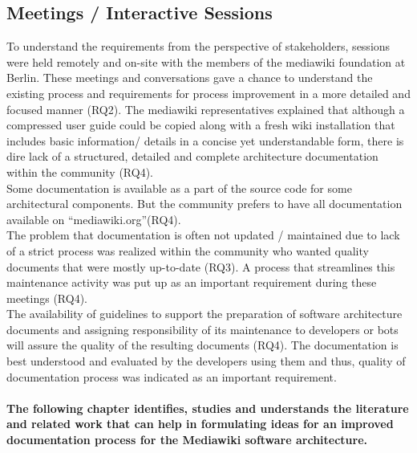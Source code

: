 \subsection{Meetings / Interactive Sessions}
\indent To understand the requirements from the perspective of stakeholders, sessions were held remotely and on-site with the members of the mediawiki foundation at Berlin. These meetings and conversations gave a chance to understand the existing process and requirements for process improvement in a more detailed and focused manner (RQ2).
The mediawiki representatives explained that although a compressed user guide could be copied along with a fresh wiki installation that includes basic information/ details in a concise yet understandable form, there is dire lack of a structured, detailed and complete architecture documentation within the community (RQ4). 
\\\indent Some documentation is available as a part of the source code for some architectural components. But the community prefers to have all documentation available on \enquote{mediawiki.org}(RQ4).
\\\indent The problem that documentation is often not updated / maintained due to lack of a strict process was realized within the community who wanted quality documents that were mostly up-to-date (RQ3). A process that streamlines this maintenance activity was put up as an important requirement during these meetings (RQ4). 
\\\indent The availability of guidelines to support the preparation of software architecture documents and assigning responsibility of its maintenance to developers or bots will assure the quality of the resulting documents (RQ4). The documentation is best understood and evaluated by the developers using them and thus, quality of documentation process was indicated as an important requirement.
\paragraph{The following chapter identifies, studies and understands the literature and related work that can help in formulating ideas for an improved documentation process for the Mediawiki software architecture. }